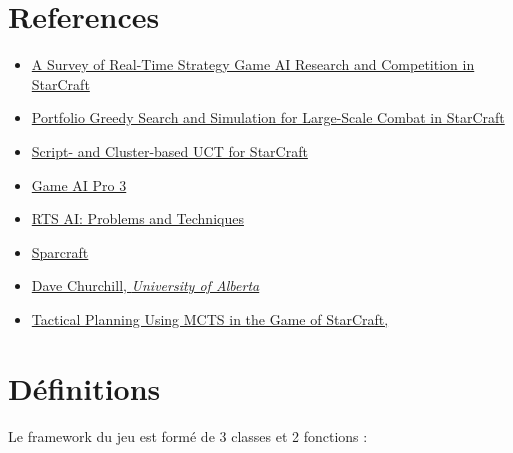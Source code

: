 \documentclass[a4paper, 11pt]{article}
\theoremstyle{definition}
\begin{document}
\section*{References}
\begin{itemize}
    \item \href{https://www.researchgate.net/publication/260711387_A_Survey_of_Real-Time_Strategy_Game_AI_Research_and_Competition_in_StarCraft}{A Survey of Real-Time Strategy Game AI Research and Competition in StarCraft}
    \item \href{https://web.archive.org/web/20130919101338/http://eldar.mathstat.uoguelph.ca:80/dashlock/cig2013/papers/paper_68.pdf}{Portfolio Greedy Search and Simulation for Large-Scale Combat in StarCraft}
    \item \href{https://storage.kghost.de/cig_proc/full/paper_76.pdf}{Script- and Cluster-based UCT for StarCraft}
    \item \href{http://www.gameaipro.com/}{Game AI Pro 3}
    \item \href{https://web.archive.org/web/20190303080330/http://richoux.fr:80/publications/ecgg15_chapter-rts_ai.pdf}{RTS AI: Problems and Techniques}
    \item \href{https://code.google.com/archive/p/sparcraft/}{Sparcraft}
    \item \href{https://www.youtube.com/@DaveChurchill}{Dave Churchill, \emph{University of Alberta}}
    \item \href{https://project.dke.maastrichtuniversity.nl/games/files/bsc/Soemers_BSc-paper.pdf}{Tactical Planning Using MCTS in the Game of StarCraft, }
\end{itemize}


\nocite{*}


\section*{Définitions}
Le framework du jeu est formé de 3 classes et 2 fonctions :
\end{document}
